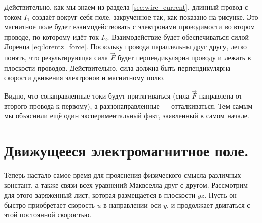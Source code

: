 \documentclass[a4paper,12pt]{article}
\numberwithin{equation}{section}
\begin{document}
Действительно, как мы знаем из раздела \ref{sec:wire_current}, длинный
провод с током $I_1$ создаёт вокруг себя поле, закрученное так, как
показано на рисунке. Это магнитное поле будет взаимодействовать с
электронами проводимости во втором проводе, по которому идёт ток
$I_2$. Взаимодействие будет обеспечиваться силой Лоренца
\eqref{eq:lorentz_force}. Поскольку провода параллельны друг другу,
легко понять, что результирующая сила $\vec{F}$ будет перпендикулярна
проводу и лежать в плоскости проводов. Действительно, сила должна быть
перпендикулярна скорости движения электронов и магнитному полю.

Видно, что сонаправленные токи будут притягиваться (сила $\vec{F}$
направлена от второго провода к первому), а разнонаправленные ---
отталкиваться. Тем самым мы объяснили ещё один экспериментальный факт,
заявленный в самом начале.  

\section{Движущееся электромагнитное поле. }
\label{sec:em_plate_moving}

Теперь настало самое время для прояснения физического смысла различных
констант, а также связи всех уравнений Маквселла друг с
другом. Рассмотрим для этого заряженный лист, которая размещается
в плоскости $yz$. Пусть он быстро приобретает скорость $u$ в
направлении оси $y$, и продолжает двигаться с этой постоянной скоростью.
\end{document}
